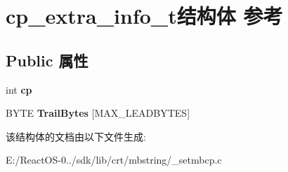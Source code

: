 \hypertarget{structcp__extra__info__t}{}\section{cp\+\_\+extra\+\_\+info\+\_\+t结构体 参考}
\label{structcp__extra__info__t}
\subsection*{Public 属性}
\begin{DoxyCompactItemize}
\item 
\mbox{\label{structcp__extra__info__t_a53601334346b5ec09951de572d54bc11}} 
int {\bfseries cp}
\item 
\mbox{\label{structcp__extra__info__t_aceb6893bee04dc30889e377d5e1a85b3}} 
B\+Y\+TE {\bfseries Trail\+Bytes} \mbox{[}M\+A\+X\+\_\+\+L\+E\+A\+D\+B\+Y\+T\+ES\mbox{]}
\end{DoxyCompactItemize}


该结构体的文档由以下文件生成\+:\begin{DoxyCompactItemize}
\item 
E\+:/\+React\+O\+S-\/0../sdk/lib/crt/mbstring/\+\_\+setmbcp.\+c\end{DoxyCompactItemize}
